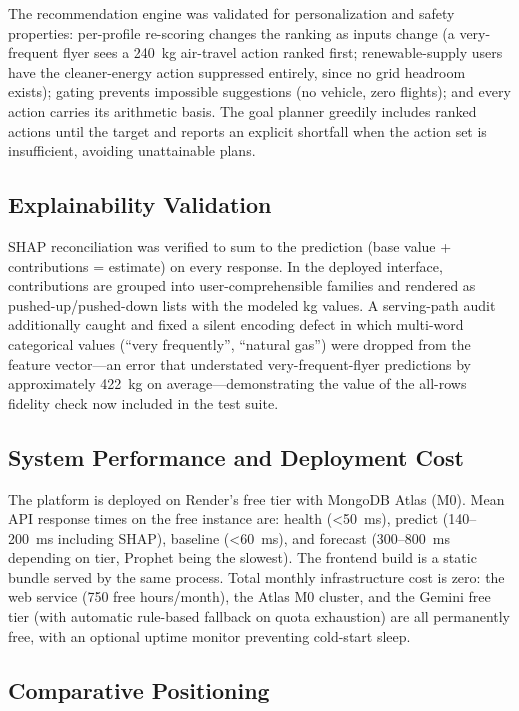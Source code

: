\documentclass[conference]{IEEEtran}
\begin{document}
The recommendation engine was validated for personalization and safety properties: per-profile re-scoring changes the ranking as inputs change (a very-frequent flyer sees a 240~kg air-travel action ranked first; renewable-supply users have the cleaner-energy action suppressed entirely, since no grid headroom exists); gating prevents impossible suggestions (no vehicle, zero flights); and every action carries its arithmetic basis. The goal planner greedily includes ranked actions until the target and reports an explicit shortfall when the action set is insufficient, avoiding unattainable plans.

\subsection{Explainability Validation}

SHAP reconciliation was verified to sum to the prediction (base value + contributions = estimate) on every response. In the deployed interface, contributions are grouped into user-comprehensible families and rendered as pushed-up/pushed-down lists with the modeled kg values. A serving-path audit additionally caught and fixed a silent encoding defect in which multi-word categorical values (``very frequently'', ``natural gas'') were dropped from the feature vector---an error that understated very-frequent-flyer predictions by approximately 422~kg on average---demonstrating the value of the all-rows fidelity check now included in the test suite.

\subsection{System Performance and Deployment Cost}

The platform is deployed on Render's free tier with MongoDB Atlas (M0). Mean API response times on the free instance are: health (<50~ms), predict (140--200~ms including SHAP), baseline (<60~ms), and forecast (300--800~ms depending on tier, Prophet being the slowest). The frontend build is a static bundle served by the same process. Total monthly infrastructure cost is zero: the web service (750 free hours/month), the Atlas M0 cluster, and the Gemini free tier (with automatic rule-based fallback on quota exhaustion) are all permanently free, with an optional uptime monitor preventing cold-start sleep.

\subsection{Comparative Positioning}
\end{document}
